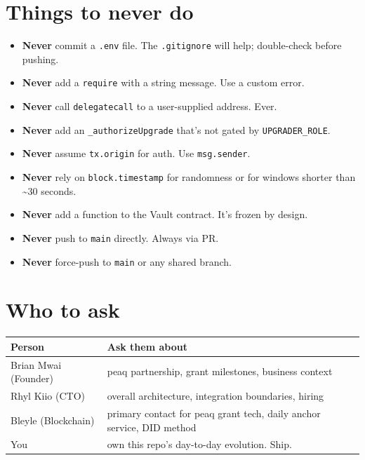 \documentclass[11pt,a4paper]{article}
\begin{document}
\section{Things to never do}

\begin{warningbox}[title=Hard rules]
\begin{itemize}[leftmargin=*, nosep]
  \item \textbf{Never} commit a \texttt{.env} file. The \texttt{.gitignore} will help; double-check before pushing.
  \item \textbf{Never} add a \texttt{require} with a string message. Use a custom error.
  \item \textbf{Never} call \texttt{delegatecall} to a user-supplied address. Ever.
  \item \textbf{Never} add an \texttt{\_authorizeUpgrade} that's not gated by \texttt{UPGRADER\_ROLE}.
  \item \textbf{Never} assume \texttt{tx.origin} for auth. Use \texttt{msg.sender}.
  \item \textbf{Never} rely on \texttt{block.timestamp} for randomness or for windows shorter than \textasciitilde 30 seconds.
  \item \textbf{Never} add a function to the Vault contract. It's frozen by design.
  \item \textbf{Never} push to \texttt{main} directly. Always via PR.
  \item \textbf{Never} force-push to \texttt{main} or any shared branch.
\end{itemize}
\end{warningbox}

\section{Who to ask}

\begin{center}
\begin{tabular}{p{4cm} p{11.5cm}}
\toprule
{\bfseries\color{axiprimary}Person} & {\bfseries\color{axiprimary}Ask them about} \\
\midrule
Brian Mwai (Founder) & peaq partnership, grant milestones, business context \\
\addlinespace[2pt]
Rhyl Kiio (CTO) & overall architecture, integration boundaries, hiring \\
\addlinespace[2pt]
Bleyle (Blockchain) & primary contact for peaq grant tech, daily anchor service, DID method \\
\addlinespace[2pt]
You & own this repo's day-to-day evolution. Ship. \\
\bottomrule
\end{tabular}
\end{center}
\end{document}
